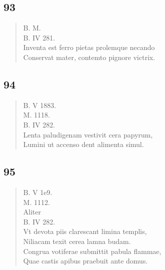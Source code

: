 \documentclass[11pt, a4paper]{report}
\begin{document}
            \subsection*{93}
      \begin{verse}
      B. M. \\ B. IV 281. \\ Inventa est ferro pietas prolemque necando \\ Conservat mater, contemto pignore victrix. \\ 
      \end{verse}
  
            \subsection*{94}
      \begin{verse}
      B. V 1883. \\ M. 1118. \\ B. IV 282. \\ Lenta paludigenam vestivit cera papyrum, \\ Lumini ut accenso dent alimenta simul. \\ 
      \end{verse}
  
            \subsection*{95}
      \begin{verse}
      B. V 1e9. \\ M. 1112. \\ Aliter \\ B. IV 282. \\ Vt devota piis clarescant limina templis, \\ Niliacam texit cerea lamna budam. \\ Congrua votiferae submittit pabula flammae, \\ Quae castis apibus praebuit ante domus. \\ 
      \end{verse}
  
\end{document}
